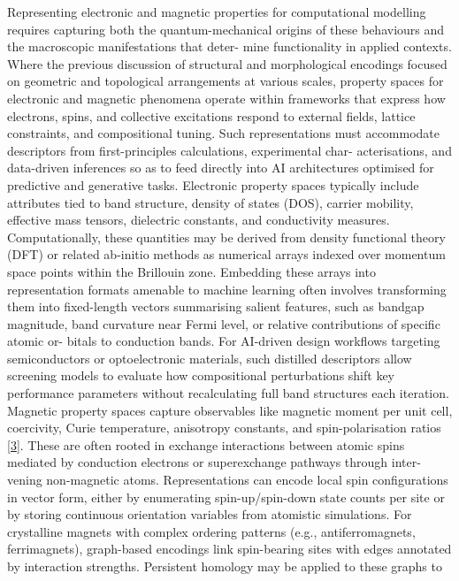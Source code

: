\documentclass[
]{article}
\begin{document}
Representing electronic and magnetic properties for computational
modelling requires capturing both the quantum-mechanical origins of
these behaviours and the macroscopic manifestations that deter- mine
functionality in applied contexts. Where the previous discussion of
structural and morphological encodings focused on geometric and
topological arrangements at various scales, property spaces for
electronic and magnetic phenomena operate within frameworks that express
how electrons, spins, and collective excitations respond to external
fields, lattice constraints, and compositional tuning. Such
representations must accommodate descriptors from first-principles
calculations, experimental char- acterisations, and data-driven
inferences so as to feed directly into AI architectures optimised for
predictive and generative tasks. Electronic property spaces typically
include attributes tied to band structure, density of states (DOS),
carrier mobility, effective mass tensors, dielectric constants, and
conductivity measures. Computationally, these quantities may be derived
from density functional theory (DFT) or related ab-initio methods as
numerical arrays indexed over momentum space points within the Brillouin
zone. Embedding these arrays into representation formats amenable to
machine learning often involves transforming them into fixed-length
vectors summarising salient features, such as bandgap magnitude, band
curvature near Fermi level, or relative contributions of specific atomic
or- bitals to conduction bands. For AI-driven design workflows targeting
semiconductors or optoelectronic materials, such distilled descriptors
allow screening models to evaluate how compositional perturbations shift
key performance parameters without recalculating full band structures
each iteration. Magnetic property spaces capture observables like
magnetic moment per unit cell, coercivity, Curie temperature, anisotropy
constants, and spin-polarisation ratios {[}\hyperref[_bookmark43]{3}{]}.
These are often rooted in exchange interactions between atomic spins
mediated by conduction electrons or superexchange pathways through
inter- vening non-magnetic atoms. Representations can encode local spin
configurations in vector form, either by enumerating spin-up/spin-down
state counts per site or by storing continuous orientation variables
from atomistic simulations. For crystalline magnets with complex
ordering patterns (e.g., antiferromagnets, ferrimagnets), graph-based
encodings link spin-bearing sites with edges annotated by interaction
strengths. Persistent homology may be applied to these graphs to
\end{document}
